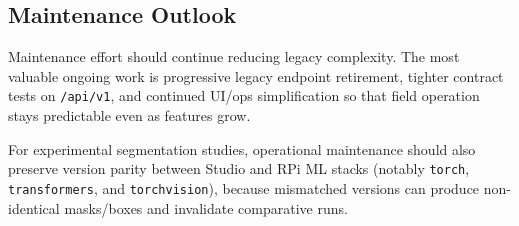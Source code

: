 \subsection{Maintenance Outlook}
Maintenance effort should continue reducing legacy complexity. The most valuable ongoing work is progressive legacy endpoint retirement, tighter contract tests on \texttt{/api/v1}, and continued UI/ops simplification so that field operation stays predictable even as features grow.

For experimental segmentation studies, operational maintenance should also preserve version parity between Studio and RPi ML stacks (notably \texttt{torch}, \texttt{transformers}, and \texttt{torchvision}), because mismatched versions can produce non-identical masks/boxes and invalidate comparative runs.
